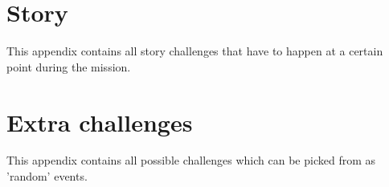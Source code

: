 \section{Story}
This appendix contains all story challenges that have to happen at a certain point during the mission.

\vspace{1cm}

\vspace{1cm}

\vspace{1cm}


% 
\vspace{1cm}

\vspace{1cm}

\vspace{1cm}

\vspace{1cm}

\vspace{1cm}

\vspace{1cm}

\vspace{1cm}

% 

\clearpage
\section{Extra challenges}
This appendix contains all possible challenges which can be picked from as 'random' events.

\vspace{1cm}

\vspace{1cm}

\vspace{1cm}

\vspace{1cm}

\vspace{1cm}

\vspace{1cm}

\vspace{1cm}

\vspace{1cm}

\vspace{1cm}

\vspace{1cm}

\vspace{1cm}

\vspace{1cm}

\vspace{1cm}
